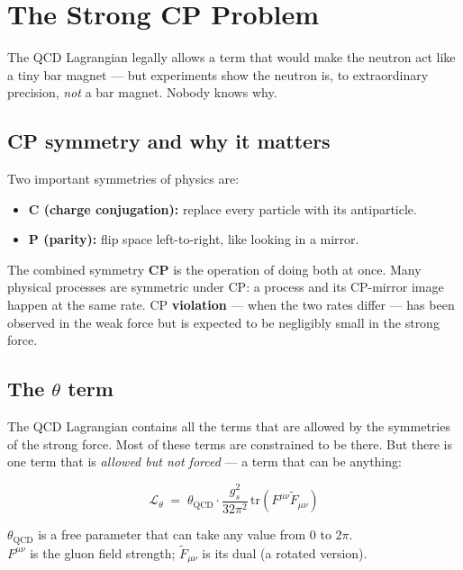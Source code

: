 \documentclass[11pt,a4paper]{article}
\newcommand{\term}[1]{\textbf{#1}}
\begin{document}
\section{The Strong CP Problem}

\begin{tcolorbox}[colback=boxorange,colframe=orange!60!black,title=The mystery in one sentence]
The QCD Lagrangian legally allows a term that would make the neutron act like a tiny bar magnet --- but experiments show the neutron is, to extraordinary precision, \emph{not} a bar magnet.  Nobody knows why.
\end{tcolorbox}

\subsection{CP symmetry and why it matters}

Two important symmetries of physics are:
\begin{itemize}
  \item \textbf{C (charge conjugation):} replace every particle with its antiparticle.
  \item \textbf{P (parity):} flip space left-to-right, like looking in a mirror.
\end{itemize}

The combined symmetry \term{CP} is the operation of doing both at once.  Many physical processes are symmetric under CP: a process and its CP-mirror image happen at the same rate.  CP \term{violation} --- when the two rates differ --- has been observed in the weak force but is expected to be negligibly small in the strong force.

\subsection{The $\theta$ term}

The QCD Lagrangian contains all the terms that are allowed by the symmetries of the strong force.  Most of these terms are constrained to be there.  But there is one term that is \emph{allowed but not forced} --- a term that can be anything:

\begin{tcolorbox}[colback=boxyellow,colframe=yellow!60!black,title=The theta term in QCD]
\[
  \mathcal{L}_\theta \;=\; \theta_{\mathrm{QCD}}
  \cdot \frac{g_s^2}{32\pi^2} \,
  \mathrm{tr}\!\left(F^{\mu\nu}\tilde{F}_{\mu\nu}\right)
\]
\begin{center}
\small $\theta_{\mathrm{QCD}}$ is a free parameter that can take any value from $0$ to $2\pi$.\\
$F^{\mu\nu}$ is the gluon field strength; $\tilde{F}_{\mu\nu}$ is its dual (a rotated version).
\end{center}
\end{tcolorbox}
\end{document}

